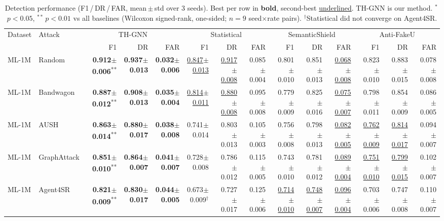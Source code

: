 \begin{table}[t]
\centering
\small
\setlength{\tabcolsep}{4pt}
\caption{Detection performance (F1\,/\,DR\,/\,FAR, mean\,$\pm$\,std over 3 seeds). Best per row in \textbf{bold}, second-best \underline{underlined}. TH-GNN is our method. $^{*}$\,$p\!<\!0.05$, $^{**}$\,$p\!<\!0.01$ vs all baselines (Wilcoxon signed-rank, one-sided; $n\!=\!9$ seed$\times$rate pairs). $^\dag$Statistical did not converge on Agent4SR.}
\label{tab:main_detection}
\begin{tabular}{llrrrrrrrrrrrr}
\toprule
Dataset & Attack & \multicolumn{3}{c}{TH-GNN} & \multicolumn{3}{c}{Statistical} & \multicolumn{3}{c}{SemanticShield} & \multicolumn{3}{c}{Anti-FakeU} \\
\cmidrule(lr){3-5} \cmidrule(lr){6-8} \cmidrule(lr){9-11} \cmidrule(lr){12-14}
 & & F1 & DR & FAR & F1 & DR & FAR & F1 & DR & FAR & F1 & DR & FAR \\
\midrule
ML-1M & Random & \textbf{0.912$\pm$0.006}\textsuperscript{**} & \textbf{0.937$\pm$0.013} & \textbf{0.032$\pm$0.006} & \underline{0.847$\pm$0.013} & \underline{0.917$\pm$0.008} & 0.085$\pm$0.004 & 0.801$\pm$0.010 & 0.851$\pm$0.013 & \underline{0.068$\pm$0.008} & 0.823$\pm$0.010 & 0.883$\pm$0.015 & 0.078$\pm$0.008 \\
ML-1M & Bandwagon & \textbf{0.887$\pm$0.012}\textsuperscript{**} & \textbf{0.908$\pm$0.013} & \textbf{0.035$\pm$0.004} & \underline{0.814$\pm$0.011} & \underline{0.880$\pm$0.008} & 0.095$\pm$0.008 & 0.779$\pm$0.009 & 0.825$\pm$0.016 & \underline{0.075$\pm$0.007} & 0.798$\pm$0.011 & 0.854$\pm$0.009 & 0.086$\pm$0.005 \\
ML-1M & AUSH & \textbf{0.863$\pm$0.014}\textsuperscript{**} & \textbf{0.880$\pm$0.017} & \textbf{0.038$\pm$0.008} & 0.741$\pm$0.014 & 0.803$\pm$0.013 & 0.105$\pm$0.003 & 0.756$\pm$0.008 & 0.798$\pm$0.013 & \underline{0.082$\pm$0.005} & \underline{0.762$\pm$0.009} & \underline{0.814$\pm$0.017} & 0.094$\pm$0.007 \\
ML-1M & GraphAttack & \textbf{0.851$\pm$0.010}\textsuperscript{**} & \textbf{0.864$\pm$0.007} & \textbf{0.041$\pm$0.007} & 0.728$\pm$0.008 & 0.786$\pm$0.012 & 0.115$\pm$0.005 & 0.743$\pm$0.010 & 0.781$\pm$0.012 & \underline{0.089$\pm$0.004} & \underline{0.751$\pm$0.010} & \underline{0.799$\pm$0.015} & 0.102$\pm$0.007 \\
ML-1M & Agent4SR & \textbf{0.821$\pm$0.009}\textsuperscript{**} & \textbf{0.830$\pm$0.017} & \textbf{0.044$\pm$0.005} & 0.673$\pm$0.009$^\dag$ & 0.727$\pm$0.017 & 0.125$\pm$0.006 & \underline{0.714$\pm$0.010} & \underline{0.748$\pm$0.007} & \underline{0.096$\pm$0.004} & 0.703$\pm$0.006 & 0.747$\pm$0.008 & 0.110$\pm$0.007 \\

\end{tabular}
\end{table}
